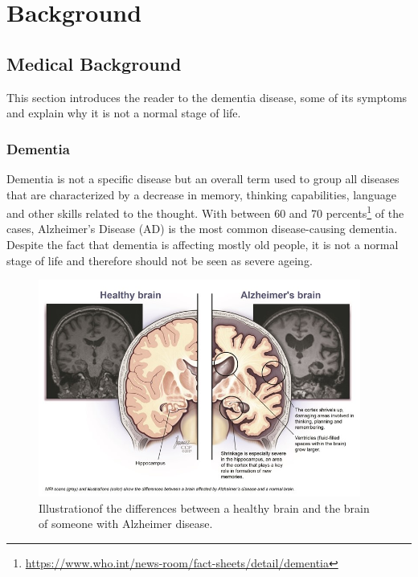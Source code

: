 \chapter{Background}
\label{chap:background}

\section{Medical Background}
This section introduces the reader to the dementia disease, some of its symptoms and explain why it is not a normal stage of life. 

\label{sec:medical_background}

\subsection{Dementia}
Dementia is not a specific disease but an overall term used to group all diseases that are characterized by a decrease in memory, thinking capabilities, language and other skills related to the thought. With between 60 and 70 percents\footnote{\href{https://www.who.int/news-room/fact-sheets/detail/dementia}{https://www.who.int/news-room/fact-sheets/detail/dementia}} of the cases, Alzheimer's Disease (AD) is the most common disease-causing dementia. Despite the fact that dementia is affecting mostly old people, it is not a normal stage of life and therefore should not be seen as severe ageing.

\begin{figure}
 \centering
 \includegraphics[width=400]{figures/Alzheimer_brain.jpg}
 \caption[Test]{Illustration\footnotemark of the differences between a healthy brain and the brain of someone with Alzheimer disease.}
 \label{fig:alzheimerbrain}
\end{figure}

